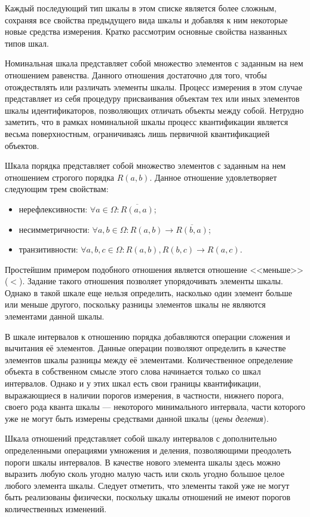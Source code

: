 Каждый последующий тип шкалы в этом списке является более сложным,
сохраняя все свойства предыдущего вида шкалы и добавляя к ним некоторые новые средства измерения.
Кратко рассмотрим основные свойства названных типов шкал.

Номинальная шкала представляет собой множество элементов с заданным на нем отношением равенства.
Данного отношения достаточно для того, чтобы отождествлять или различать элементы шкалы.
Процесс измерения в этом случае представляет из себя процедуру присваивания объектам тех
или иных элементов шкалы идентификаторов, позволяющих отличать объекты между собой.
Нетрудно заметить, что в рамках номинальной шкалы процесс квантификации является весьма
поверхностным, ограничиваясь лишь первичной квантификацией объектов.

Шкала порядка представляет собой множество элементов с заданным на нем отношением
строгого порядка \( R(a, b) \). Данное отношение удовлетворяет следующим трем свойствам:
\begin{itemize}
\item нерефлексивности:
  \( \forall a \in \Omega: \overline{R(a, a)} \);
\item несимметричности:
  \( \forall a, b \in \Omega: R(a, b) \rightarrow \overline{R(b, a)} \);
\item транзитивности:
  \( \forall a, b, c \in \Omega: R(a, b), R(b, c) \rightarrow R(a, c) \).
\end{itemize}

Простейшим примером подобного отношения является отношение <<меньше>> (\( < \)).
Задание такого отношения позволяет упорядочивать элементы шкалы.
Однако в такой шкале еще нельзя определить, насколько один элемент больше или меньше другого,
поскольку разницы элементов шкалы не являются элементами данной шкалы.

В шкале интервалов к отношению порядка добавляются операции сложения и вычитания
её элементов. Данные операции позволяют определить в качестве элементов шкалы
разницы между её элементами.
Количественное определение объекта в собственном смысле этого слова начинается только
со шкал интервалов. Однако и у этих шкал есть свои границы квантификации,
выражающиеся в наличии порогов измерения, в частности, нижнего порога,
своего рода кванта шкалы --- некоторого минимального интервала,
части которого уже не могут быть измерены средствами данной шкалы (\emph{цены деления}).

Шкала отношений представляет собой шкалу интервалов с дополнительно определенными
операциями умножения и деления, позволяющими преодолеть пороги шкалы интервалов.
В качестве нового элемента шкалы здесь можно выразить любую сколь угодно малую часть
или сколь угодно большое целое любого элемента шкалы.
Следует отметить, что элементы такой уже не могут быть реализованы физически,
поскольку шкалы отношений не имеют порогов количественных изменений.

